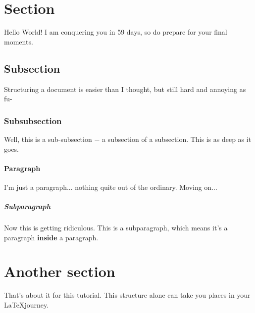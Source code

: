\documentclass{article}
\begin{document}
	\section{Section}
	Hello World! I am conquering you in 59 days, so do prepare for your final moments.
	
	\subsection{Subsection}
	Structuring a document is easier than I thought, but still hard and annoying as fu-
	
	\subsubsection{Subsubsection}
	Well, this is a sub-subsection $-$ a subsection of a subsection. This is as deep as it goes.
	
	\paragraph{Paragraph}
	I'm just a paragraph... nothing quite out of the ordinary. Moving on...
	
	\subparagraph{Subparagraph}
	Now this is getting ridiculous. This is a subparagraph, which means it's a paragraph \textbf{inside} a paragraph.
	
	\section{Another section}
	That's about it for this tutorial. This structure alone can take you places in your \LaTeX journey.
\end{document}
